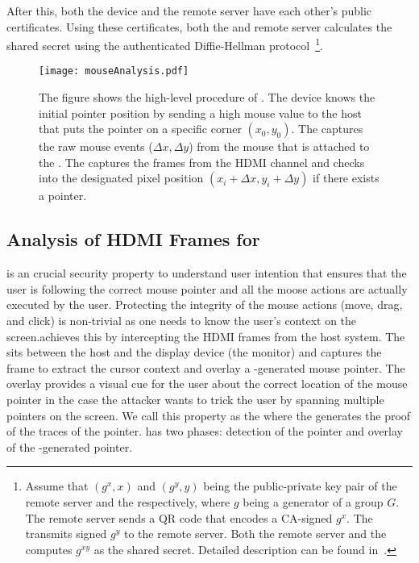 After this, both the device and the remote server have each other's public certificates. Using these certificates, both the \device and remote server calculates the shared secret using the authenticated Diffie-Hellman protocol~\footnote{Assume that $(g^x, x)$ and $(g^y, y)$ being the public-private key pair of the remote server and the \device respectively, where $g$ being a generator of a group $G$. The remote server sends a QR code that encodes a CA-signed $g^x$. The \device transmits signed $g^y$ to the remote server. Both the remote server and the \device computes $g^{xy}$ as the shared secret. Detailed description can be found  in~\cite{blake1998authenticated}.}.



\begin{figure}[t]
\centering
\texttt{[image: mouseAnalysis.pdf]}
\caption{\textbf{\Pop} The figure shows the high-level procedure of \pop. The device knows the initial pointer position by sending a high mouse value to the host that puts the pointer on a specific corner $(x_0, y_0)$. \one The \device captures the raw mouse events ($\Delta x, \Delta y$) from the mouse that is attached to the \device. \two The \device captures the frames from the HDMI channel and checks into the designated pixel position $(x_i + \Delta x, y_i + \Delta y)$ if there exists a pointer.}
\label{fig:mouseAnalysis}
\centering
\end{figure}



\subsection{Analysis of HDMI Frames for \Pop}
\label{sec:systemDesign:analysis}

\Pop is an crucial security property to understand user intention that ensures that the user is following the correct mouse pointer and all the moose actions are actually executed by the user. Protecting the integrity of the mouse actions (move, drag, and click) is non-trivial as one needs to know the user's context on the screen.\name achieves this by intercepting the HDMI frames from the host system. The \device sits between the host and the display device (the monitor) and captures the frame to extract the cursor context and overlay a \device-generated mouse pointer. The overlay provides a visual cue for the user about the correct location of the mouse pointer in the case the attacker wants to trick the user by spanning multiple pointers on the screen. We call this property as the \emph{\pop} where the \device generates the proof of the traces of the pointer. \Pop has two phases: detection of the pointer and overlay of the \device-generated pointer.

